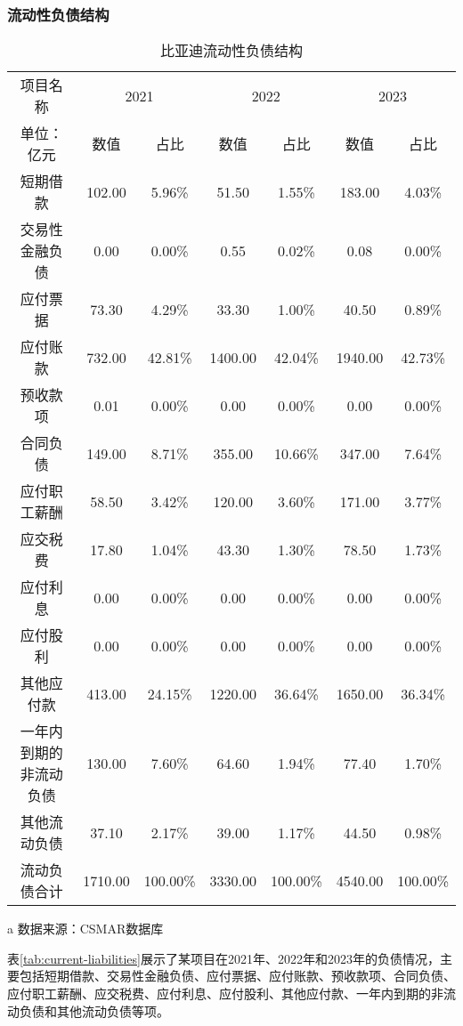 \subsubsection{流动性负债结构}
\begin{table}
  \centering
  \begin{threeparttable}[c]
    \caption{比亚迪流动性负债结构}
    \label{tab:current-liabilities}
    \begin{tabular}{ccccccc}
      \toprule
      项目名称 & \multicolumn{2}{c}{2021} & \multicolumn{2}{c}{2022} & \multicolumn{2}{c}{2023} \\
        单位：亿元 & 数值 & 占比 & 数值 & 占比 & 数值 & 占比 \\
      \midrule
        短期借款 & 102.00  & 5.96\% & 51.50  & 1.55\% & 183.00  & 4.03\% \\
        交易性金融负债 & 0.00  & 0.00\% & 0.55  & 0.02\% & 0.08  & 0.00\% \\
        应付票据 & 73.30  & 4.29\% & 33.30  & 1.00\% & 40.50  & 0.89\% \\
        应付账款 & 732.00  & 42.81\% & 1400.00  & 42.04\% & 1940.00  & 42.73\% \\
        预收款项 & 0.01  & 0.00\% & 0.00  & 0.00\% & 0.00  & 0.00\% \\
        合同负债 & 149.00  & 8.71\% & 355.00  & 10.66\% & 347.00  & 7.64\% \\
        应付职工薪酬 & 58.50  & 3.42\% & 120.00  & 3.60\% & 171.00  & 3.77\% \\
        应交税费 & 17.80  & 1.04\% & 43.30  & 1.30\% & 78.50  & 1.73\% \\
        应付利息 & 0.00  & 0.00\% & 0.00  & 0.00\% & 0.00  & 0.00\% \\
        应付股利 & 0.00  & 0.00\% & 0.00  & 0.00\% & 0.00  & 0.00\% \\
        其他应付款 & 413.00  & 24.15\% & 1220.00  & 36.64\% & 1650.00  & 36.34\% \\
        一年内到期的非流动负债 & 130.00  & 7.60\% & 64.60  & 1.94\% & 77.40  & 1.70\% \\
        其他流动负债 & 37.10  & 2.17\% & 39.00  & 1.17\% & 44.50  & 0.98\% \\
        流动负债合计 & 1710.00  & 100.00\% & 3330.00  & 100.00\% & 4540.00  & 100.00\% \\
      \bottomrule
    \end{tabular}
    \begin{tablenotes}
      \item [a] 数据来源：CSMAR数据库
    \end{tablenotes}
  \end{threeparttable}
\end{table}
表\eqref{tab:current-liabilities}展示了某项目在2021年、2022年和2023年的负债情况，主要包括短期借款、交易性金融负债、应付票据、应付账款、预收款项、合同负债、应付职工薪酬、应交税费、应付利息、应付股利、其他应付款、一年内到期的非流动负债和其他流动负债等项。

